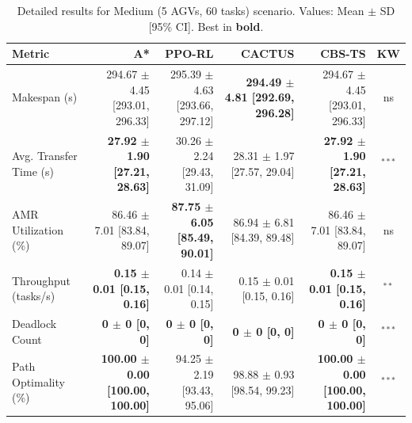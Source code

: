 \begin{table}[htbp]
\centering
\caption{Detailed results for Medium (5 AGVs, 60 tasks) scenario. Values: Mean $\pm$ SD [95\% CI]. Best in \textbf{bold}.}
\label{tab:detail_s2_medium}
\small
\begin{tabular}{@{}lrrrrc@{}}
\toprule
\textbf{Metric} & \textbf{A*} & \textbf{PPO-RL} & \textbf{CACTUS} & \textbf{CBS-TS} & \textbf{KW} \\
\midrule
Makespan (s) & 294.67 $\pm$ 4.45 [293.01, 296.33] & 295.39 $\pm$ 4.63 [293.66, 297.12] & \textbf{294.49 $\pm$ 4.81 [292.69, 296.28]} & 294.67 $\pm$ 4.45 [293.01, 296.33] & ns \\
Avg. Transfer Time (s) & \textbf{27.92 $\pm$ 1.90 [27.21, 28.63]} & 30.26 $\pm$ 2.24 [29.43, 31.09] & 28.31 $\pm$ 1.97 [27.57, 29.04] & \textbf{27.92 $\pm$ 1.90 [27.21, 28.63]} & $^{***}$ \\
AMR Utilization (\%) & 86.46 $\pm$ 7.01 [83.84, 89.07] & \textbf{87.75 $\pm$ 6.05 [85.49, 90.01]} & 86.94 $\pm$ 6.81 [84.39, 89.48] & 86.46 $\pm$ 7.01 [83.84, 89.07] & ns \\
Throughput (tasks/s) & \textbf{0.15 $\pm$ 0.01 [0.15, 0.16]} & 0.14 $\pm$ 0.01 [0.14, 0.15] & 0.15 $\pm$ 0.01 [0.15, 0.16] & \textbf{0.15 $\pm$ 0.01 [0.15, 0.16]} & $^{**}$ \\
Deadlock Count & \textbf{0 $\pm$ 0 [0, 0]} & \textbf{0 $\pm$ 0 [0, 0]} & \textbf{0 $\pm$ 0 [0, 0]} & \textbf{0 $\pm$ 0 [0, 0]} & $^{***}$ \\
Path Optimality (\%) & \textbf{100.00 $\pm$ 0.00 [100.00, 100.00]} & 94.25 $\pm$ 2.19 [93.43, 95.06] & 98.88 $\pm$ 0.93 [98.54, 99.23] & \textbf{100.00 $\pm$ 0.00 [100.00, 100.00]} & $^{***}$ \\
\bottomrule
\end{tabular}
\end{table}